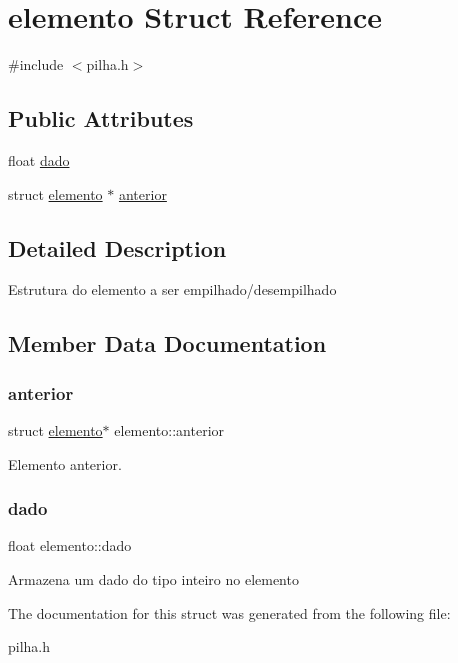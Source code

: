 \hypertarget{structelemento}{}\section{elemento Struct Reference}
\label{structelemento}


{\ttfamily \#include $<$pilha.\+h$>$}

\subsection*{Public Attributes}
\begin{DoxyCompactItemize}
\item 
float \mbox{\hyperlink{structelemento_a29d9d4044865d7e62004e57d537ca1d8}{dado}}
\item 
struct \mbox{\hyperlink{structelemento}{elemento}} $\ast$ \mbox{\hyperlink{structelemento_a96f30997b93371f5a62c192a0b9282f7}{anterior}}
\end{DoxyCompactItemize}


\subsection{Detailed Description}
Estrutura do elemento a ser empilhado/desempilhado 

\subsection{Member Data Documentation}
\mbox{\label{structelemento_a96f30997b93371f5a62c192a0b9282f7}} 
\subsubsection{\texorpdfstring{anterior}{anterior}}
{\footnotesize\ttfamily struct \mbox{\hyperlink{structelemento}{elemento}}$\ast$ elemento\+::anterior}

Elemento anterior. \mbox{\label{structelemento_a29d9d4044865d7e62004e57d537ca1d8}} 
\subsubsection{\texorpdfstring{dado}{dado}}
{\footnotesize\ttfamily float elemento\+::dado}

Armazena um dado do tipo inteiro no elemento 

The documentation for this struct was generated from the following file\+:\begin{DoxyCompactItemize}
\item 
pilha.\+h\end{DoxyCompactItemize}
